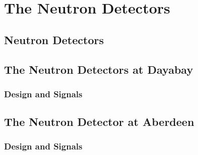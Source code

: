 
\chapter{The Neutron Detectors}

\section{Neutron Detectors}

\section{The Neutron Detectors at Dayabay}

\subsection{Design and Signals}

\section{The Neutron Detector at Aberdeen}

\subsection{Design and Signals}
